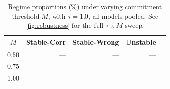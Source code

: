 \begin{table}[t]
  \caption{Regime proportions ({\%}) under varying commitment threshold $M$, with $\tau = 1.0$, all models pooled.
  See \cref{fig:robustness} for the full $\tau \times M$ sweep.}
  \label{tab:robustness}
  \vskip 0.1in
  \begin{center}\begin{small}\begin{tabular}{crrrr}
    \toprule
    $M$ & Stable-Corr & Stable-Wrong & Unstable \\
    \midrule
    0.50 & --- & --- & --- \\
    0.75 & --- & --- & --- \\
    1.00 & --- & --- & --- \\
    \bottomrule
  \end{tabular}\end{small}\end{center}
\end{table}
